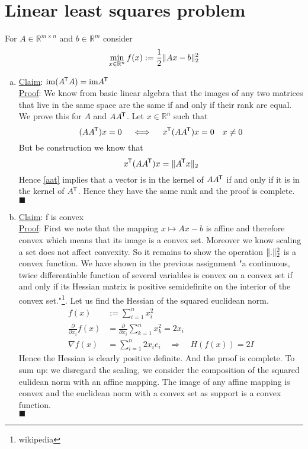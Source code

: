 \documentclass{article}
\DeclarePairedDelimiter{\norm}{\lVert}{\rVert}
\newcommand*{\tran}{^{\mkern-1.5mu\mathsf{T}}}%
\begin{document}
	\section{Linear least squares problem}
	For $A\in \mathbb R^{m\times n}$ and $b\in \mathbb R^m $ consider
	\begin{equation}\label{ls}
		\min _{x\in \mathbb R^n} f(x) := \frac{1}{2} \norm{Ax - b}_2^2
	\end{equation}
	\begin{enumerate}[a)]
		\item 
		\underline{Claim}: $\mathrm{im} (A\tran A) = \mathrm{im} A\tran $\\
		\underline{Proof}: We know from basic linear algebra that the images of any two matrices that live in the same space are the same if and only if their rank are equal. We prove this for $A$ and $AA\tran$. Let $x\in \mathbb R^n$ such that  
		\begin{equation}\label{aat}
			(AA\tran) x  = 0 \quad \iff \quad x\tran (AA\tran)x = 0 \quad x \neq 0
		\end{equation}
		But be construction we know that 
		\begin{equation}
			x\tran (AA\tran)x = \norm{A\tran x}_2
		\end{equation}
		Hence \ref{aat} implies that a vector is in the kernel of $AA\tran$ if and only if it is in the kernel of $A\tran$. Hence they have the same rank and the proof is complete.\\
		$\blacksquare$
		
		\item \underline{Claim}: f is convex\\
		\underline{Proof}: First we note that the mapping $ x \mapsto Ax - b$ is affine and therefore convex which means that its image is a convex set. Moreover we know scaling a set does not affect convexity. So it remains to show the operation $\norm . _2^2 $ is a convex function. We have shown in the previous assignment "a continuous, twice differentiable function of several variables is convex on a convex set if and only if its Hessian matrix is positive semidefinite on the interior of the convex set."\footnote{wikipedia}. Let us find the Hessian of the squared euclidean norm. 
		\begin{align}
		f(x) &:= \sum_{i=1}^{n}x_i^2 \\[1ex]
		\frac{\partial}{\partial x_i}f(x)  &= \frac{\partial}{\partial x_i}\sum_{k=1}^n x_k^2 = 2x_i\\[2ex]
		\nabla f(x) &= \sum_{i=1}^{n}2x_i e_i \quad \Rightarrow \quad 
		H(f(x)) = 2I
		\end{align} 
		Hence the Hessian is clearly positive definite. And the proof is complete. To sum up: we disregard the scaling, we consider the composition of the squared eulidean norm with an affine mapping. The image of any affine mapping is convex and the euclidean norm with a convex set as support is a convex function. \\
		$\blacksquare$
		\clearpage
		

\end{enumerate}
\end{document}
